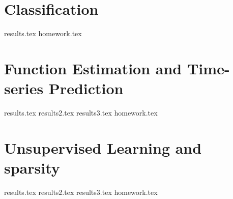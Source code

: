 

\addto\captionsenglish{\renewcommand{\chaptername}{Session}}



 
\tableofcontents
\setcounter{page}{0}

\chapter{Classification}
{results.tex}
{homework.tex}

\chapter{Function Estimation and Time-series Prediction}
{results.tex}
{results2.tex}
{results3.tex}
{homework.tex}

\chapter{Unsupervised Learning and sparsity}
{results.tex}
{results2.tex}
{results3.tex}
{homework.tex}


